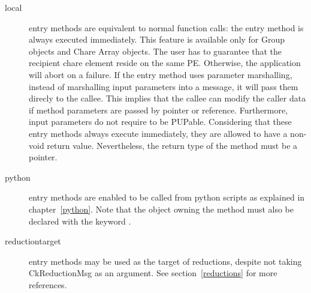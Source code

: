 \begin{description}
\item[local] entry methods are equivalent to normal function
calls: the entry method is always executed immediately. This feature is
available only for Group objects and Chare Array objects. The user has to
guarantee that the recipient chare element reside on the same PE. Otherwise,
the application will abort on a failure. If the  entry method uses
parameter marshalling, instead of marshalling input parameters into a message,
it will pass them direcly to the callee. This implies that the callee can
modify the caller data if method parameters are passed by pointer or reference.
Furthermore, input parameters do not require to be PUPable. Considering that
these entry methods always execute immediately, they are allowed to have a
non-void return value. Nevertheless, the return type of the method must be a
pointer.

\item[python] entry methods are enabled to be
called from python scripts as explained in chapter~\ref{python}. Note that the object owning the method must also be declared with the
keyword .

\item[reductiontarget] entry methods may be used as the
target of reductions, despite not taking CkReductionMsg as an argument.
See section~\ref{reductions} for more references.

\end{description}

